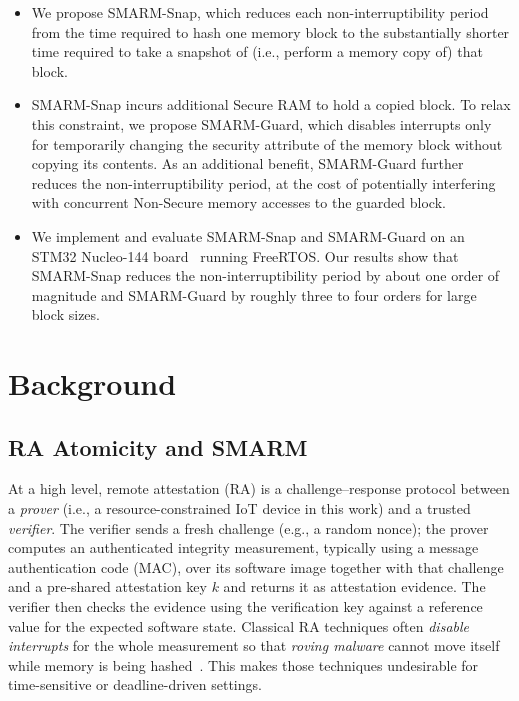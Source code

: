 \documentclass[conference]{IEEEtran}
\newcommand{\smarmcopy}{SMARM-Snap\xspace}
\newcommand{\smarmlock}{SMARM-Guard\xspace}
\newcommand\oak[1]{\textcolor{red}{OAK: #1}}
\begin{document}
\begin{itemize}
\item We propose \smarmcopy, which reduces each non-interruptibility period from the time required to hash one memory block to the substantially shorter time required to take a snapshot of (i.e., perform a memory copy of) that block.

 

\item \smarmcopy incurs additional Secure RAM to hold a copied block. To relax this constraint, we propose \smarmlock, which disables interrupts only for temporarily changing the security attribute of the memory block without copying its contents.
As an additional benefit, \smarmlock further reduces the non-interruptibility period,
at the cost of potentially interfering with concurrent Non-Secure memory accesses
to the guarded block.

\item We implement and evaluate \smarmcopy and \smarmlock on an STM32 Nucleo-144 board~\cite{stm32nucleo144} running FreeRTOS. Our results show that \smarmcopy{} reduces the non-interruptibility
period by about one order of magnitude and \smarmlock{} by roughly
three to four orders for large block sizes.


\end{itemize}


\section{Background}
\label{sec:background}

\subsection{RA Atomicity and SMARM}

At a high level, remote attestation (RA) is a challenge--response
protocol between a \emph{prover} (i.e., a resource-constrained IoT device in this work) and a trusted \emph{verifier}.
The verifier sends a fresh challenge (e.g., a random nonce); 
the prover computes an authenticated integrity measurement, typically using a message authentication code (MAC), over its software image together with that challenge and a pre-shared attestation key $k$ and returns it as attestation evidence. 
The verifier then checks the evidence using the verification key against a reference value for the expected software state.
Classical RA techniques often \emph{disable interrupts} for the whole measurement so that \emph{roving malware} cannot move itself while memory is being hashed~\cite{eldefrawy2012smart,nunes2019vrased}.
This makes those techniques undesirable for time-sensitive or deadline-driven settings.
\end{document}
